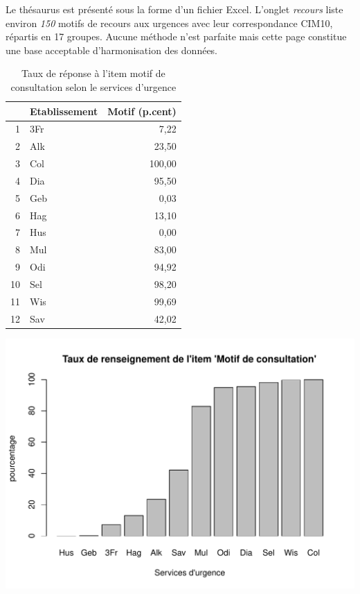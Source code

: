 \documentclass[12pt,english,french,twoside]{book}\usepackage[]{graphicx}\usepackage[]{color}
\makeatletter
\def\maxwidth{ %
  \ifdim\Gin@nat@width>\linewidth
    \linewidth
  \else
    \Gin@nat@width
  \fi
}
\makeatother
\begin{document}
Le thésaurus est présenté sous la forme d'un fichier Excel. L'onglet \emph{recours} liste environ \emph{150} motifs de recours aux urgences avec leur correspondance CIM10, répartis en 17 groupes. Aucune méthode n'est parfaite mais cette page constitue une base acceptable d'harmonisation des données.


\begin{table}[ht]
\centering
\begin{tabular}{rlr}
  \hline
 & Etablissement & Motif (p.cent) \\ 
  \hline
1 & 3Fr & 7,22 \\ 
  2 & Alk & 23,50 \\ 
  3 & Col & 100,00 \\ 
  4 & Dia & 95,50 \\ 
  5 & Geb & 0,03 \\ 
  6 & Hag & 13,10 \\ 
  7 & Hus & 0,00 \\ 
  8 & Mul & 83,00 \\ 
  9 & Odi & 94,92 \\ 
  10 & Sel & 98,20 \\ 
  11 & Wis & 99,69 \\ 
  12 & Sav & 42,02 \\ 
   \hline
\end{tabular}
\caption[Motif de consultation]{Taux de réponse à l'item motif de consultation selon le services d'urgence} 
\label{lab:motif}
\end{table}

\includegraphics[width=\maxwidth]{figure/motifss-1} 
\end{document}

